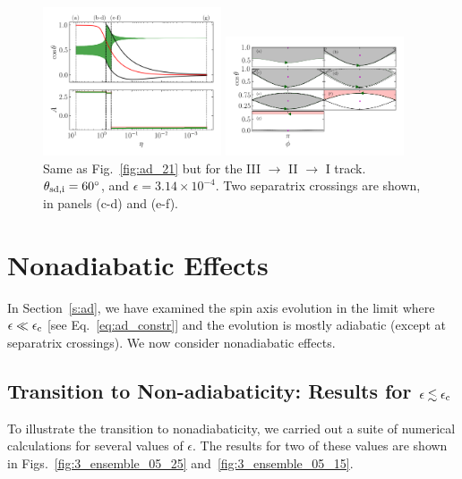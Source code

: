 \documentclass[twocolumn,twocolappendix]{aastex63}
\begin{document}
\begin{figure}
    \centering
    \includegraphics[width=0.47\textwidth]{plots_diskdisp/3testo321.png}

    \includegraphics[width=0.47\textwidth]{plots_diskdisp/3testo321_subplots.png}
    \caption{Same as Fig.~\ref{fig:ad_21} but for the III $\to$ II $\to$ I
    track. $\theta_{\rm sd, i} = 60^\circ$, and $\epsilon = 3.14 \times
    10^{-4}$. Two separatrix crossings are shown, in panels (c-d) and
    (e-f).}\label{fig:ad_321}
\end{figure}


\section{Nonadiabatic Effects}\label{s:nonad}

In Section~\ref{s:ad}, we have examined the spin axis evolution in the limit
where $\epsilon \ll \epsilon_{\rm c}$ [see Eq.~\eqref{eq:ad_constr}] and the
evolution is mostly adiabatic (except at separatrix crossings). We now consider
nonadiabatic effects.

\subsection{Transition to Non-adiabaticity: Results for $\epsilon\lesssim
\epsilon_{\rm c}$}\label{ss:transition}

To illustrate the transition to nonadiabaticity, we carried out a suite of
numerical calculations for several values of $\epsilon$. The results for two of these
values are shown in Figs.~\ref{fig:3_ensemble_05_25}
and~\ref{fig:3_ensemble_05_15}.
\end{document}
